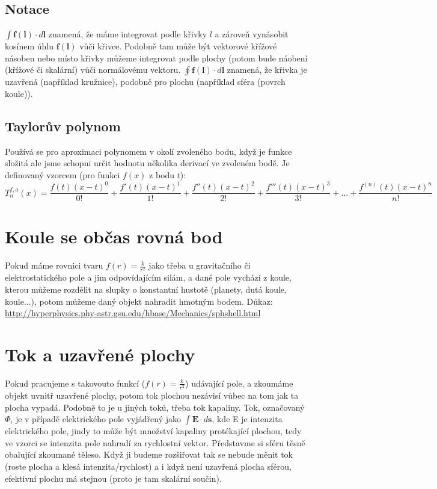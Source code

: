\documentclass[titlepage]{book}
\begin{document}
\subsection{Notace}
$\int \boldsymbol f(\boldsymbol l) \cdot d\boldsymbol l$ znamená, že máme integrovat podle křivky $l$ a zároveň vynásobit kosínem úhlu $\boldsymbol f(\boldsymbol l)$ vůči křivce. Podobně tam může být vektorové křížové násoben nebo místo křivky můžeme integrovat podle plochy (potom bude náobení (křížové či skalární) vůči normálovému vektoru. $\oint \boldsymbol f(\boldsymbol l) \cdot d\boldsymbol l$ znamená, že křivka je uzavřená (například kružnice), podobně pro plochu (například sféra (povrch koule)).
\subsection{Taylorův polynom}
Používá se pro aproximaci polynomem v okolí zvoleného bodu, když je funkce složitá ale jsme schopni určit hodnotu několika derivací ve zvoleném bodě. Je definovaný vzorcem (pro funkci $f(x)$ z bodu $t$):
\begin{equation}
T_n^{f,a}(x) = \frac{f(t)(x-t)^0}{0!} + \frac{f'(t)(x-t)^1}{1!} + \frac{f''(t)(x-t)^2}{2!} + \frac{f'''(t)(x-t)^3}{3!} + ... + \frac{f^{(n)}(t)(x-t)^n}{n!}
\end{equation}
\section{Koule se občas rovná bod}
Pokud máme rovnici tvaru $f(r) = \frac{k}{r^2}$ jako třeba u gravitačního či elektrostatického pole a jim odpovídajícím silám, a dané pole vychází z koule, kterou můžeme rozdělit na slupky o konstantní hustotě (planety, dutá koule, koule...), potom můžeme daný objekt nahradit hmotným bodem. Důkaz: \url{http://hyperphysics.phy-astr.gsu.edu/hbase/Mechanics/sphshell.html}\\
\section{Tok a uzavřené plochy}\label{sec:tok}
Pokud pracujeme s takovouto funkcí ($f(r) = \frac{k}{r^2}$) udávající pole, a zkoumáme objekt uvnitř uzavřené plochy, potom tok plochou nezávisí vůbec na tom jak ta plocha vypadá. Podobně to je u jiných toků, třeba tok kapaliny. Tok, označovaný $\Phi$, je v případě elektrického pole vyjádřený jako $\int \boldsymbol E \cdot d\boldsymbol s$, kde E je intenzita elektrického pole, jindy to může být množství kapaliny protékající plochou, tedy ve vzorci se intenzita pole nahradí za rychlostní vektor. Představme si sféru těsně obalující zkoumané těleso. Když ji budeme rozšiřovat tak se nebude měnit tok (roste plocha a klesá  intenzita/rychlost) a i když není uzavřená plocha sférou, efektivní plochu má stejnou (proto je tam skalární součin).
\end{document}
